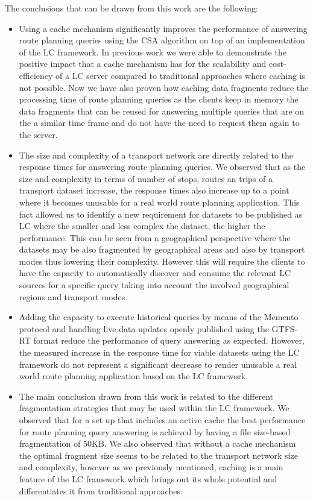 \documentclass[sw]{iosart2x}
\begin{document}
	The conclusions that can be drawn from this work are the following:
	\begin{itemize}
	\item Using a cache mechanism significantly improves the performance of answering route planning queries using the CSA algorithm on top of an implementation of the LC framework. In previous work we were able to demonstrate the positive impact that a cache mechanism has for the scalability and cost-efficiency of a LC server compared to traditional approaches where caching is not possible. Now we have also proven how caching data fragments reduce the processing time of route planning queries as the clients keep in memory the data fragments that can be reused for answering multiple queries that are on the a similar time frame and do not have the need to request them again to the server. 
	\item The size and complexity of a transport network are directly related to the response times for answering route planning queries. We observed that as the size and complexity in terms of number of stops, routes an trips of a transport dataset increase, the response times also increase up to a point where it becomes unusable for a real world route planning application. This fact allowed us to identify a new requirement for datasets to be published as LC where the smaller and less complex the dataset, the higher the performance. This can be seen from a geographical perspective where the datasets may be also fragmented by geographical areas and also by transport modes thus lowering their complexity. However this will require the clients to have the capacity to automatically discover and consume the relevant LC sources for a specific query taking into account the involved geographical regions and transport modes.     
	\item Adding the capacity to execute historical queries by means of the Memento protocol and handling live data updates openly published using the GTFS-RT format reduce the performance of query answering as expected. However, the measured increase in the response time for viable datasets using the LC framework do not represent a significant decrease to render unusable a real world route planning application based on the LC framework.  
	\item The main conclusion drawn from this work is related to the different fragmentation strategies that may be used within the LC framework. We observed that for a set up that includes an active cache the best performance for route planning query answering is achieved by having a file size-based fragmentation of 50KB. We also observed that without a cache mechanism the optimal fragment size seems to be related to the transport network size and complexity, however as we previously mentioned, caching is a main feature of the LC framework which brings out its whole potential and differentiates it from traditional approaches.

\end{itemize}
\end{document}
